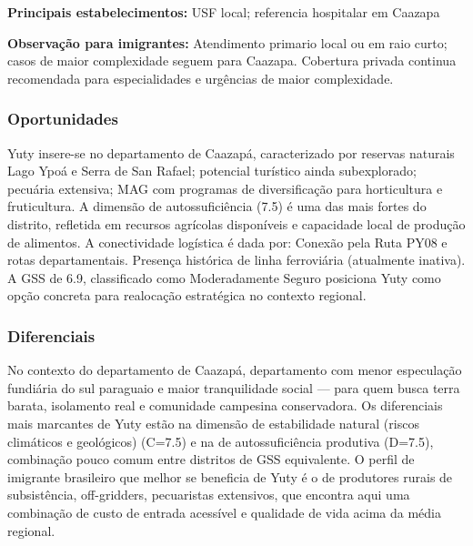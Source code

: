 \textbf{Principais estabelecimentos:} USF local; referencia hospitalar
em Caazapa

\textbf{Observação para imigrantes:} Atendimento primario local ou em
raio curto; casos de maior complexidade seguem para Caazapa. Cobertura
privada continua recomendada para especialidades e urgências de maior
complexidade.

\subsubsection*{Oportunidades}\label{oport-yuty-0610}
Yuty insere-se no departamento de Caazapá, caracterizado por reservas naturais Lago Ypoá e Serra de San Rafael; potencial turístico ainda subexplorado; pecuária extensiva; MAG com programas de diversificação para horticultura e fruticultura. A dimensão de autossuficiência (7.5) é uma das mais fortes do distrito, refletida em recursos agrícolas disponíveis e capacidade local de produção de alimentos. A conectividade logística é dada por: Conexão pela Ruta PY08 e rotas departamentais. Presença histórica de linha ferroviária (atualmente inativa). A GSS de 6.9, classificado como Moderadamente Seguro posiciona Yuty como opção concreta para realocação estratégica no contexto regional.

\subsubsection*{Diferenciais}\label{dif-yuty-0610}
No contexto do departamento de Caazapá, departamento com menor especulação fundiária do sul paraguaio e maior tranquilidade social — para quem busca terra barata, isolamento real e comunidade campesina conservadora. Os diferenciais mais marcantes de Yuty estão na dimensão de estabilidade natural (riscos climáticos e geológicos) (C=7.5) e na de autossuficiência produtiva (D=7.5), combinação pouco comum entre distritos de GSS equivalente. O perfil de imigrante brasileiro que melhor se beneficia de Yuty é o de produtores rurais de subsistência, off-gridders, pecuaristas extensivos, que encontra aqui uma combinação de custo de entrada acessível e qualidade de vida acima da média regional.
